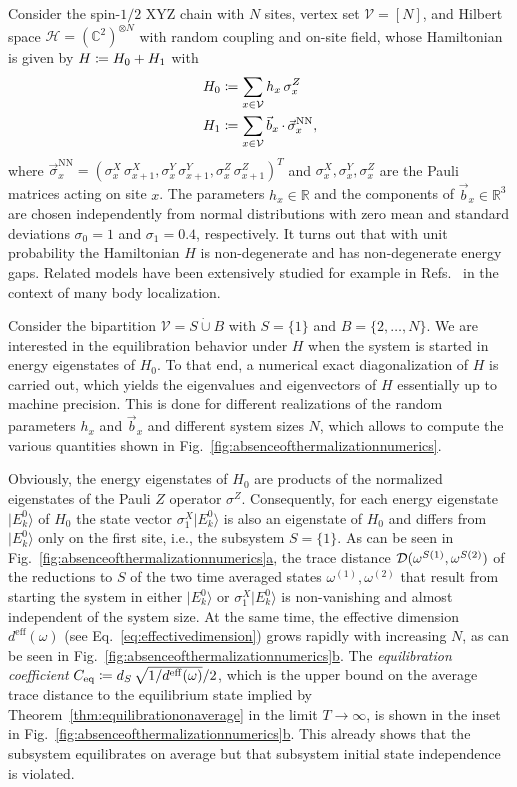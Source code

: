 \documentclass[a4paper,12pt,listof=totoc,index=totoc,bibliography=totoc,headsepline=false,headings=normal,BCOR16.153846mm,DIV12,headinclude,twoside,cleardoublepage=empty,numbers=noenddot,final]{scrreprt}
\newcommand{\refsub}[2]{\hyperref[#1]{\ref*{#1}#2}}
\theoremstyle{mystyle}
\numberwithin{equation}{section}
\numberwithin{figure}{section}
\numberwithin{lemma}{section}
\numberwithin{theorem}{section}
\numberwithin{corollary}{section}
\numberwithin{definition}{section}
\numberwithin{conjecture}{section}
\numberwithin{observation}{section}
\newcommand{\+}{\mkern2mu}
\newcommand{\coloneqq}{\mathrel{\vcentcolon\mkern-1.2mu=}} %
\newcommand{\dunion}{\mathbin{\dot{\cup}}}
\newcommand{\texteqref}[1]{Eq.~\eqref{#1}}
\newcommand{\argdot}{{\,\cdot\,}}
\renewcommand{\H}{H}
\newcommand{\Vset}{\mathcal{V}}
\newcommand{\ket}[1]{|#1\rangle}
\newcommand{\eqcoef}{C_{\mathrm{eq}}}
\newcommand{\deff}{d^{\mathrm{eff}}}
\newcommand{\tracedistance}[3][]{
  \ifthenelse{\equal{#2}{}}
  {\ifthenelse{\equal{#3}{}}
    {\mathcal{D}_{#1}}{}
  }{
    \ifthenelse{\equal{#1}{}}
    {\operatorname{\mathcal{D}}(#2,#3)}
    {\operatorname{\mathcal{D}}_{#1}(#2,#3)}
  }
}
\DeclareMathOperator{\1}{\mathds{1}}
\newcommand{\mc}[1]{\mathcal{#1}}
\newcommand{\mcH}{\mc{H}}
\newcommand{\mb}[1]{\mathbb{#1}}
\newcommand{\R}{\mb{R}}
\renewcommand{\C}{\mb{C}} %
\begin{document}
Consider the spin-$1/2$ XYZ chain with $N$ sites, vertex set $\Vset = [N]$, and Hilbert space $\mcH = (\C^2)^{\otimes N}$ with random coupling and on-site field, whose Hamiltonian is given by $\H \coloneqq \H_0 + \H_1$ with 
\begin{align}
  \H_0 &\coloneqq \sum_{x\in\Vset} h_x\,\sigma^Z_x \\
  \H_1 &\coloneqq \sum_{x \in \Vset} \vec{b}_x \argdot \vec{\sigma}^{\mathrm{NN}}_x ,
\end{align}
where $\vec{\sigma}^{\mathrm{NN}}_x = (\sigma^X_x\,\sigma^X_{x+1},\sigma^Y_x\,\sigma^Y_{x+1},\sigma^Z_x\,\sigma^Z_{x+1})^T$ and $\sigma^X_x,\sigma^Y_x,\sigma^Z_x$ are the Pauli matrices acting on site $x$.
The parameters $h_x \in \R$ and the components of $\vec{b}_x \in \R^3$ are chosen independently from normal distributions with zero mean and standard deviations $\sigma_0=1$ and $\sigma_1=0.4$, respectively.
It turns out that with unit probability the Hamiltonian $\H$ is non-degenerate and has non-degenerate energy gaps.
Related models have been extensively studied for example in Refs.~\cite{PhysRevB.82.17,1006.1634v1} in the context of many body localization.

Consider the bipartition $\Vset = S \dunion B$ with $S = \{1\}$ and $B = \{2,\dots,N\}$.
We are interested in the equilibration behavior under $\H$ when the system is started in energy eigenstates of $\H_0$.
To that end, a numerical exact diagonalization of $\H$ is carried out, which yields the eigenvalues and eigenvectors of $\H$ essentially up to machine precision.
This is done for different realizations of the random parameters $h_x$ and $\vec{b}_x$ and different system sizes $N$, which allows to compute the various quantities shown in Fig.~\ref{fig:absenceofthermalizationnumerics}.

Obviously, the energy eigenstates of $\H_0$ are products of the normalized eigenstates of the Pauli $Z$ operator $\sigma^Z$.
Consequently, for each energy eigenstate $\ket{E_k^0}$ of $\H_0$ the state vector $\sigma^X_1 \ket{E_k^0}$ is also an eigenstate of $\H_0$ and differs from $\ket{E_k^0}$ only on the first site, i.e., the subsystem $S = \{1\}$.
As can be seen in Fig.~\refsub{fig:absenceofthermalizationnumerics}{a}, the trace distance $\tracedistance{\omega^{S(1)}}{\omega^{S(2)}}$ of the reductions to $S$ of the two time averaged states $\omega^{(1)},\omega^{(2)}$ that result from starting the system in either $\ket{E_k^0}$ or $\sigma^X_1 \ket{E_k^0}$ is non-vanishing and almost independent of the system size.
At the same time, the effective dimension $\deff(\omega)$ (see \texteqref{eq:effectivedimension}) grows rapidly with increasing $N$, as can be seen in Fig.~\refsub{fig:absenceofthermalizationnumerics}{b}.
The \emph{equilibration coefficient} $\eqcoef \coloneqq d_S\,\sqrt{1/\deff(\omega)}/2$, which is the upper bound on the average trace distance to the equilibrium state implied by Theorem~\ref{thm:equilibrationonaverage} in the limit $T\to\infty$, is shown in the inset in Fig.~\refsub{fig:absenceofthermalizationnumerics}{b}.
This already shows that the subsystem equilibrates on average but that subsystem initial state independence is violated.
\end{document}
